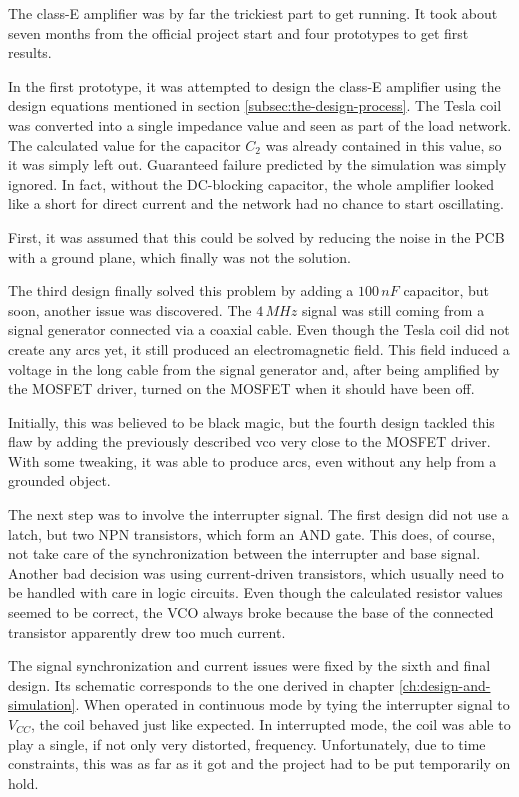 The class-E amplifier was by far the trickiest part to get running. It took about seven months from the official project start and four prototypes to get first results.

In the first prototype, it was attempted to design the class-E amplifier using the design equations mentioned in section \ref{subsec:the-design-process}. The Tesla coil was converted into a single impedance value and seen as part of the load network. The calculated value for the capacitor \(C_2\) was already contained in this value, so it was simply left out. Guaranteed failure predicted by the simulation was simply ignored. In fact, without the DC-blocking capacitor, the whole amplifier looked like a short for direct current and the network had no chance to start oscillating.

First, it was assumed that this could be solved by reducing the noise in the PCB with a ground plane, which finally was not the solution.

The third design finally solved this problem by adding a \(100\,nF\) capacitor, but soon, another issue was discovered. The \(4\,MHz\) signal was still coming from a signal generator connected via a coaxial cable. Even though the Tesla coil did not create any arcs yet, it still produced an electromagnetic field. This field induced a voltage in the long cable from the signal generator and, after being amplified by the MOSFET driver, turned on the MOSFET when it should have been off.

Initially, this was believed to be black magic, but the fourth design tackled this flaw by adding the previously described \gls{vco} very close to the MOSFET driver. With some tweaking, it was able to produce arcs, even without any help from a grounded object.

The next step was to involve the interrupter signal. The first design did not use a latch, but two NPN transistors, which form an AND gate. This does, of course, not take care of the synchronization between the interrupter and base signal. Another bad decision was using current-driven transistors, which usually need to be handled with care in logic circuits. Even though the calculated resistor values seemed to be correct, the VCO always broke because the base of the connected transistor apparently drew too much current.

The signal synchronization and current issues were fixed by the sixth and final design. Its schematic corresponds to the one derived in chapter \ref{ch:design-and-simulation}. When operated in continuous mode by tying the interrupter signal to \(V_{CC}\), the coil behaved just like expected. In interrupted mode, the coil was able to play a single, if not only very distorted, frequency. Unfortunately, due to time constraints, this was as far as it got and the project had to be put temporarily on hold.

